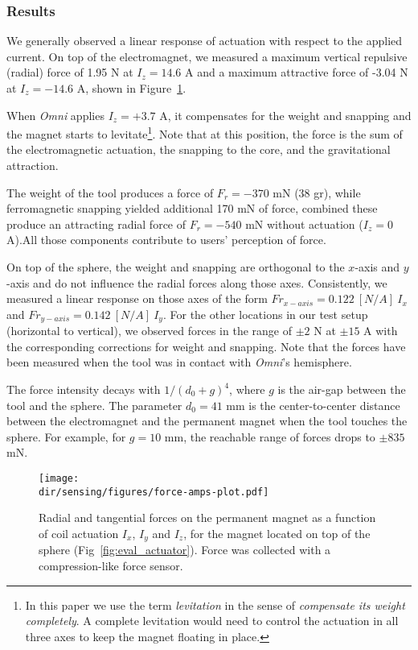 \subsubsection{Results}
We generally observed a linear response of actuation with respect to the applied current.
On top of the electromagnet, we measured a maximum vertical repulsive (radial) force of 1.95 N at $I_z = 14.6$ A and a maximum attractive force of -3.04 N at $I_z = -14.6$ A, shown in Figure~\ref{fig:Fz_vs_iz}.

When \textit{Omni} applies $I_z = +3.7 $ A, it compensates for the weight and snapping and the magnet starts to levitate\footnote{In this paper we use the term \emph{levitation} in the sense of \emph{compensate its weight completely}. A complete levitation would need to control the actuation in all three axes to keep the magnet floating in place.}. Note that at this position, the force is the sum of the electromagnetic actuation, the snapping to the core, and the gravitational attraction.

The weight of the tool produces a force of $F_r = -370$ mN (38 gr), while ferromagnetic snapping yielded additional 170 mN of force, combined these produce an attracting radial force of $F_r = -540$ mN without actuation ($I_z = 0$ A).All those components contribute to users' perception of force.

On top of the sphere, the weight and snapping are orthogonal to the $x$-axis and $y$-axis and do not influence the radial forces along those axes. Consistently, we measured a linear response on those axes of the form $Fr_{x-axis} = 0.122 ~[N/A] ~I_{x}$ and $Fr_{y-axis} = 0.142 ~[N/A] ~I_{y}$. For the other locations in our test setup (horizontal to vertical), we observed forces in the range of $\pm 2$ N at $\pm 15$ A with the corresponding corrections for weight and snapping. Note that the forces have been measured when the tool was in contact with \textit{Omni}'s hemisphere.

The force intensity decays with $1/(d_0 + g)^4$, where $g$ is the air-gap between the tool and the sphere. The parameter $d_0 = 41$ mm is the center-to-center distance between the electromagnet and the permanent magnet when the tool touches the sphere. For example, for $g = 10$ mm, the reachable range of forces drops to $\pm 835$ mN. 
\begin{figure}[!t]
\centering
\texttt{[image: \\dir/sensing/figures/force-amps-plot.pdf]}
\caption{Radial and tangential forces on the permanent magnet as a function of coil actuation $I_x$, $I_y$ and $I_z$, for the magnet located on top of the sphere (Fig~\ref{fig:eval_actuator}). Force was collected with a compression-like force sensor.}
\label{fig:Fz_vs_iz}
\end{figure}

